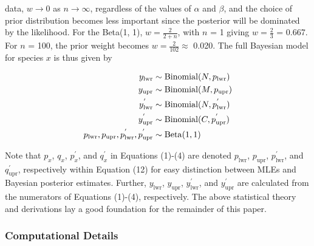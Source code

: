 \documentclass[12pt]{article}
\begin{document}
data, $w \rightarrow 0$ as $n \rightarrow \infty$, regardless of the values of $\alpha$ and $\beta$, and the choice of prior distribution becomes less important since the posterior will be dominated by the likelihood. For the Beta(1, 1), $w = \frac{2}{2 + n}$, with $n$ = 1 giving $w = \frac{2}{3}$ = 0.667. For $n$ = 100, the prior weight becomes $w = \frac{2}{102} \approx$ 0.020. The full Bayesian model for species $x$ is thus given by

\begin{align}
\notag y_\mathrm{lwr} &\sim \mathrm{Binomial}(N, p_\mathrm{lwr}) \\ 
\notag y_\mathrm{upr} &\sim \mathrm{Binomial}(M, p_\mathrm{upr}) \\ 
y^{'}_\mathrm{lwr} &\sim \mathrm{Binomial}(N, p^{'}_\mathrm{lwr}) \\ 
 \notag y^{'}_\mathrm{upr} &\sim \mathrm{Binomial}(C, p^{'}_\mathrm{upr}) \\ 
\notag p_\mathrm{lwr}, p_\mathrm{upr}, p^{'}_\mathrm{lwr}, p^{'}_\mathrm{upr}
&\sim \mathrm{Beta}(1, 1)
\end{align}

\noindent Note that $p_x$, $q_x$, $p^{'}_x$, and $q^{'}_x$ in Equations (1)-(4) are denoted $p_\mathrm{lwr}$, $p_\mathrm{upr}$, $p^{'}_\mathrm{lwr}$, and $q^{'}_\mathrm{upr}$, respectively within Equation (12) for easy distinction between MLEs and Bayesian posterior estimates. Further, $y_\mathrm{lwr}$, $y_\mathrm{upr}$, $y^{'}_\mathrm{lwr}$, and $y^{'}_\mathrm{upr}$ are calculated from the numerators of Equations (1)-(4), respectively. The above statistical theory and derivations lay a good foundation for the remainder of this paper.

\subsubsection{Computational Details}
\end{document}
